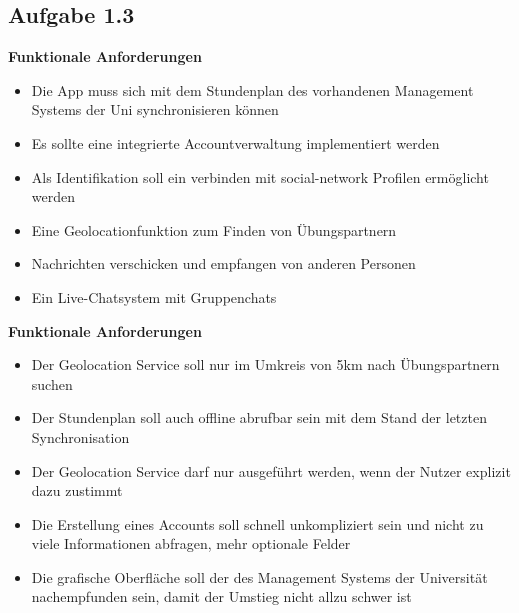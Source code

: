 \documentclass[a4paper,graphics,11pt]{article}
\newcommand\aufgabe[1]{\subsection*{Aufgabe #1}}
\begin{document}
\aufgabe{1.3}
\textbf{Funktionale Anforderungen}\\
\begin{itemize}
\item Die App muss sich mit dem Stundenplan des vorhandenen Management Systems der Uni synchronisieren können\\
\item Es sollte eine integrierte Accountverwaltung implementiert werden\\
\item Als Identifikation soll ein verbinden mit social-network Profilen ermöglicht werden\\
\item Eine Geolocationfunktion zum Finden von Übungspartnern \\
\item Nachrichten verschicken und empfangen von anderen Personen\\
\item Ein Live-Chatsystem mit Gruppenchats \\
\end{itemize}

\noindent \textbf{Funktionale Anforderungen}\\
\begin{itemize}
\item Der Geolocation Service soll nur im Umkreis von 5km nach Übungspartnern suchen\\
\item Der Stundenplan soll auch offline abrufbar sein mit dem Stand der letzten Synchronisation\\
\item Der Geolocation Service darf nur ausgeführt werden, wenn der Nutzer explizit dazu zustimmt\\
\item Die Erstellung eines Accounts soll schnell unkompliziert sein und nicht zu viele Informationen abfragen, mehr optionale Felder\\
\item Die grafische Oberfläche soll der des Management Systems der Universität nachempfunden sein, damit der Umstieg nicht allzu schwer ist\\
\end{itemize}
\end{document}
